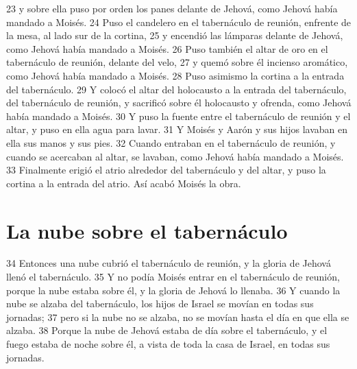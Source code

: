 23 y sobre ella puso por orden los panes delante de Jehová, como Jehová había mandado a Moisés.
24 Puso el candelero en el tabernáculo de reunión, enfrente de la mesa, al lado sur de la cortina,
25 y encendió las lámparas delante de Jehová, como Jehová había mandado a Moisés.
26 Puso también el altar de oro en el tabernáculo de reunión, delante del velo,
27 y quemó sobre él incienso aromático, como Jehová había mandado a Moisés.
28 Puso asimismo la cortina a la entrada del tabernáculo.
29 Y colocó el altar del holocausto a la entrada del tabernáculo, del tabernáculo de reunión, y sacrificó sobre él holocausto y ofrenda, como Jehová había mandado a Moisés.
30 Y puso la fuente entre el tabernáculo de reunión y el altar, y puso en ella agua para lavar.
31 Y Moisés y Aarón y sus hijos lavaban en ella sus manos y sus pies.
32 Cuando entraban en el tabernáculo de reunión, y cuando se acercaban al altar, se lavaban, como Jehová había mandado a Moisés.
33 Finalmente erigió el atrio alrededor del tabernáculo y del altar, y puso la cortina a la entrada del atrio. Así acabó Moisés la obra.

\section{La nube sobre el tabernáculo}

34 Entonces una nube cubrió el tabernáculo de reunión, y la gloria de Jehová llenó el tabernáculo.
35 Y no podía Moisés entrar en el tabernáculo de reunión, porque la nube estaba sobre él, y la gloria de Jehová lo llenaba.
36 Y cuando la nube se alzaba del tabernáculo, los hijos de Israel se movían en todas sus jornadas;
37 pero si la nube no se alzaba, no se movían hasta el día en que ella se alzaba.
38 Porque la nube de Jehová estaba de día sobre el tabernáculo, y el fuego estaba de noche sobre él, a vista de toda la casa de Israel, en todas sus jornadas.


